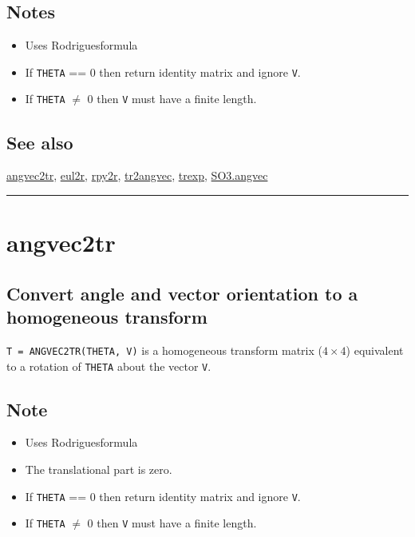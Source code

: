 \subsection*{Notes}
\begin{itemize}
  \item Uses Rodrigues\textquotesingle  formula
  \item If \texttt{THETA} == 0 then return identity matrix and ignore \texttt{V}.
  \item If \texttt{THETA} $\ne$ 0 then \texttt{V} must have a finite length.
\end{itemize}

\subsection*{See also}


\hyperlink{angvec2tr}{\color{blue} angvec2tr}, \hyperlink{eul2r}{\color{blue} eul2r}, \hyperlink{rpy2r}{\color{blue} rpy2r}, \hyperlink{tr2angvec}{\color{blue} tr2angvec}, \hyperlink{trexp}{\color{blue} trexp}, \hyperlink{SO3.angvec}{\color{blue} SO3.angvec}

\vspace{1.5ex}\rule{\textwidth}{1mm}

\hypertarget{angvec2tr}{\section*{angvec2tr}}
\subsection*{Convert angle and vector orientation to a homogeneous transform}


\texttt{T = ANGVEC2TR(THETA, V)} is a homogeneous transform matrix ($4 \times 4$) equivalent to a
rotation of \texttt{THETA} about the vector \texttt{V}.


\subsection*{Note}
\begin{itemize}
  \item Uses Rodrigues\textquotesingle  formula
  \item The translational part is zero.
  \item If \texttt{THETA} == 0 then return identity matrix and ignore \texttt{V}.
  \item If \texttt{THETA} $\ne$ 0 then \texttt{V} must have a finite length.
\end{itemize}

